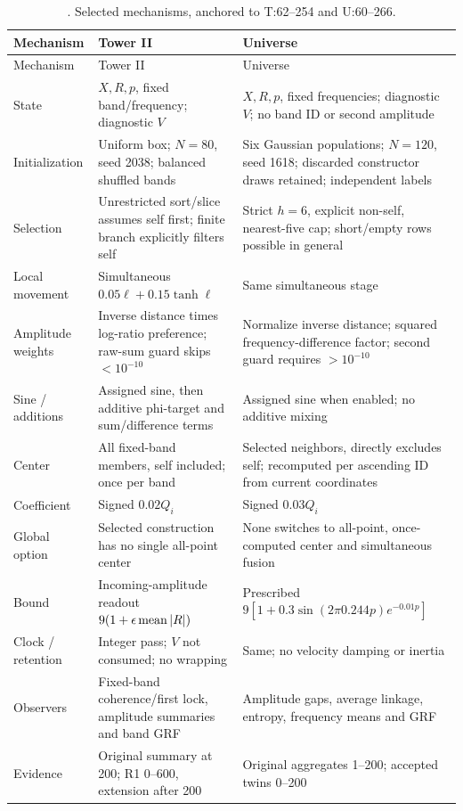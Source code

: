 \begin{longtable}{P{25mm}P{60mm}P{62mm}}
\caption{. Selected mechanisms, anchored to T:62--254 and U:60--266.}\label{tab:compare}\\
\toprule Mechanism & Tower II & Universe\\\midrule
\endfirsthead\toprule Mechanism & Tower II & Universe\\\midrule\endhead
State & \(X,R,p\), fixed band/frequency; diagnostic \(V\) & \(X,R,p\), fixed frequencies; diagnostic \(V\); no band ID or second amplitude\\
Initialization & Uniform box; \(N=80\), seed 2038; balanced shuffled bands & Six Gaussian populations; \(N=120\), seed 1618; discarded constructor draws retained; independent labels\\
Selection & Unrestricted sort/slice assumes self first; finite branch explicitly filters self & Strict \(h=6\), explicit non-self, nearest-five cap; short/empty rows possible in general\\
Local movement & Simultaneous \(0.05\ell+0.15\tanh\ell\) & Same simultaneous stage\\
Amplitude weights & Inverse distance times log-ratio preference; raw-sum guard skips \(<10^{-10}\) & Normalize inverse distance; squared frequency-difference factor; second guard requires \(>10^{-10}\)\\
Sine / additions & Assigned sine, then additive phi-target and sum/difference terms & Assigned sine when enabled; no additive mixing\\
Center & All fixed-band members, self included; once per band & Selected neighbors, directly excludes self; recomputed per ascending ID from current coordinates\\
Coefficient & Signed \(0.02Q_i\) & Signed \(0.03Q_i\)\\
Global option & Selected construction has no single all-point center & None switches to all-point, once-computed center and simultaneous fusion\\
Bound & Incoming-amplitude readout \(9(1+\epsilon\operatorname{mean}|R|)\) & Prescribed \(9[1+0.3\sin(2\pi0.244p)e^{-0.01p}]\)\\
Clock / retention & Integer pass; \(V\) not consumed; no wrapping & Same; no velocity damping or inertia\\
Observers & Fixed-band coherence/first lock, amplitude summaries and band GRF & Amplitude gaps, average linkage, entropy, frequency means and GRF\\
Evidence & Original summary at 200; R1 0--600, extension after 200 & Original aggregates 1--200; accepted twins 0--200\\
\bottomrule
\end{longtable}


